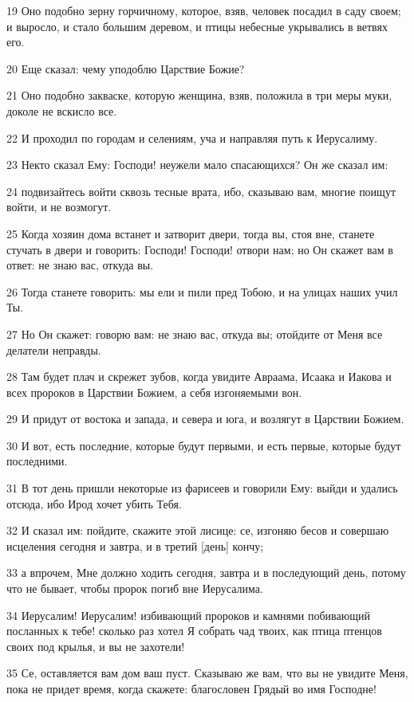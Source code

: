 \par 19 Оно подобно зерну горчичному, которое, взяв, человек посадил в саду своем; и выросло, и стало большим деревом, и птицы небесные укрывались в ветвях его.
\par 20 Еще сказал: чему уподоблю Царствие Божие?
\par 21 Оно подобно закваске, которую женщина, взяв, положила в три меры муки, доколе не вскисло все.
\par 22 И проходил по городам и селениям, уча и направляя путь к Иерусалиму.
\par 23 Некто сказал Ему: Господи! неужели мало спасающихся? Он же сказал им:
\par 24 подвизайтесь войти сквозь тесные врата, ибо, сказываю вам, многие поищут войти, и не возмогут.
\par 25 Когда хозяин дома встанет и затворит двери, тогда вы, стоя вне, станете стучать в двери и говорить: Господи! Господи! отвори нам; но Он скажет вам в ответ: не знаю вас, откуда вы.
\par 26 Тогда станете говорить: мы ели и пили пред Тобою, и на улицах наших учил Ты.
\par 27 Но Он скажет: говорю вам: не знаю вас, откуда вы; отойдите от Меня все делатели неправды.
\par 28 Там будет плач и скрежет зубов, когда увидите Авраама, Исаака и Иакова и всех пророков в Царствии Божием, а себя изгоняемыми вон.
\par 29 И придут от востока и запада, и севера и юга, и возлягут в Царствии Божием.
\par 30 И вот, есть последние, которые будут первыми, и есть первые, которые будут последними.
\par 31 В тот день пришли некоторые из фарисеев и говорили Ему: выйди и удались отсюда, ибо Ирод хочет убить Тебя.
\par 32 И сказал им: пойдите, скажите этой лисице: се, изгоняю бесов и совершаю исцеления сегодня и завтра, и в третий [день] кончу;
\par 33 а впрочем, Мне должно ходить сегодня, завтра и в последующий день, потому что не бывает, чтобы пророк погиб вне Иерусалима.
\par 34 Иерусалим! Иерусалим! избивающий пророков и камнями побивающий посланных к тебе! сколько раз хотел Я собрать чад твоих, как птица птенцов своих под крылья, и вы не захотели!
\par 35 Се, оставляется вам дом ваш пуст. Сказываю же вам, что вы не увидите Меня, пока не придет время, когда скажете: благословен Грядый во имя Господне!

